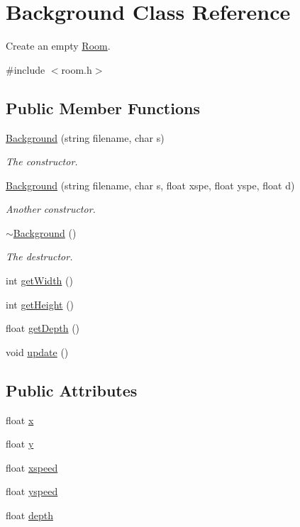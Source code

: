 \hypertarget{class_background}{\section{Background Class Reference}
\label{class_background}
}


Create an empty \hyperlink{class_room}{Room}.  




{\ttfamily \#include $<$room.\-h$>$}

\subsection*{Public Member Functions}
\begin{DoxyCompactItemize}
\item 
\hyperlink{class_background_a929e270a8ddd85e11ed2ad3047bb950e}{Background} (string filename, char s)
\begin{DoxyCompactList}\small\item\em The constructor. \end{DoxyCompactList}\item 
\hyperlink{class_background_a753b5718d40416da2762ae25aa18d6e8}{Background} (string filename, char s, float xspe, float yspe, float d)
\begin{DoxyCompactList}\small\item\em Another constructor. \end{DoxyCompactList}\item 
\hyperlink{class_background_a36754df1deb720393217ade59da41557}{$\sim$\-Background} ()
\begin{DoxyCompactList}\small\item\em The destructor. \end{DoxyCompactList}\item 
int \hyperlink{class_background_a5b52f684a9a71e4604df4e3cc2ac4cc1}{get\-Width} ()
\item 
int \hyperlink{class_background_a4f05317c68fcdfd675f40d043eb89f4c}{get\-Height} ()
\item 
float \hyperlink{class_background_a07f47ff11dea75b93db524f1ac8bcef2}{get\-Depth} ()
\item 
void \hyperlink{class_background_acab58b65d4299d4bd51b8376e8c3e3d3}{update} ()
\end{DoxyCompactItemize}
\subsection*{Public Attributes}
\begin{DoxyCompactItemize}
\item 
float \hyperlink{class_background_af6650023418d2982420370f87eeff2de}{x}
\item 
float \hyperlink{class_background_adb462ce7dc04d3b09698f1baa3d173e6}{y}
\item 
float \hyperlink{class_background_a9519d783cf9640d9889a79424bab2f4e}{xspeed}
\item 
float \hyperlink{class_background_a7335929df2f4e7fbd31014d8f14a4b81}{yspeed}
\item 
float \hyperlink{class_background_a5df71997c2d1628f4e2d6d9c1cd08e08}{depth}
\end{DoxyCompactItemize}
